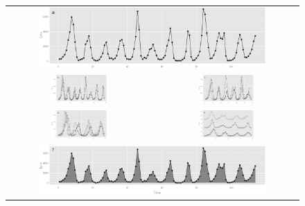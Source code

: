 \documentclass[12pt]{article}
\begin{document}
\begin{figure}[htp]
\begin{center}
\begin{tabular}{cc}
\multicolumn{2}{c}{\includegraphics[width=0.8\textwidth]{graph/pipeline-16-original}}\\
\includegraphics[width=0.4\textwidth]{graph/pipeline-16-1} &
\includegraphics[width=0.4\textwidth]{graph/pipeline-16-2} \\
\includegraphics[width=0.4\textwidth]{graph/pipeline-16-xwrap} &
\includegraphics[width=0.4\textwidth]{graph/pipeline-16-xwrap-facet} \\
\multicolumn{2}{c}{\includegraphics[width=0.8\textwidth]{graph/pipeline-18-original}} \\

\end{tabular}
\end{center}
\end{figure}
\end{document}
